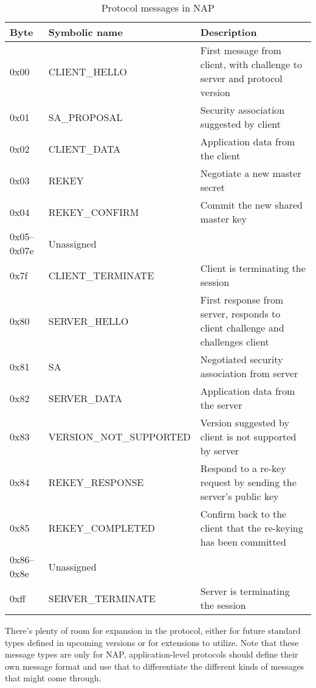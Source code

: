 \begin{table}
\caption{Protocol messages in NAP}\label{tab:protocol-messages}
\centering
    \begin{tabular}{| l | l | p{5cm} |}
    \hline
    \textbf{Byte} & \textbf{Symbolic name} & \textbf{Description} \\ \hline
    0x00 & CLIENT\_HELLO & First message from client, with challenge to server and protocol version \\ \hline
    0x01 & SA\_PROPOSAL & Security association suggested by client \\ \hline
    0x02 & CLIENT\_DATA & Application data from the client \\ \hline
    0x03 & REKEY & Negotiate a new master secret \\ \hline
    0x04 & REKEY\_CONFIRM & Commit the new shared master key \\ \hline
    0x05--0x07e & Unassigned & \\ \hline
    0x7f & CLIENT\_TERMINATE & Client is terminating the session \\ \hline
    0x80 & SERVER\_HELLO & First response from server, responds to client challenge and challenges client \\ \hline
    0x81 & SA & Negotiated security association from server \\ \hline
    0x82 & SERVER\_DATA & Application data from the server \\ \hline
    0x83 & VERSION\_NOT\_SUPPORTED & Version suggested by client is not supported by server \\ \hline
    0x84 & REKEY\_RESPONSE & Respond to a re-key request by sending the server's public key \\ \hline
    0x85 & REKEY\_COMPLETED & Confirm back to the client that the re-keying has been committed \\ \hline
    0x86--0x8e & Unassigned & \\ \hline
    0xff & SERVER\_TERMINATE & Server is terminating the session \\ \hline
    \end{tabular}
\end{table}

There's plenty of room for expansion in the protocol, either for future standard types defined in upcoming versions or for extensions to utilize. Note that these message types are only for NAP, application-level protocols should define their own message format and use that to differentiate the different kinds of messages that might come through.

